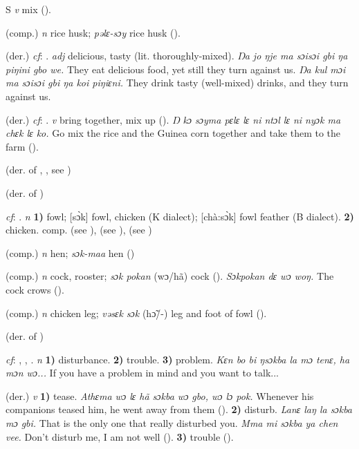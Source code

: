 \begin{letter}{S}
 \textit{v} mix (\citealt{Pichl1967}).

 (comp.) \textit{n} rice husk; \textit{pəlɛ-sɔy} rice husk (\citealt{Pichl1967}).

 (der.) \textit{cf}: . \textit{adj} delicious, tasty (lit. thoroughly-mixed). \textit{Ŋa jo ŋje ma sɔisɔi gbi ŋa piŋini gbo we.} They eat delicious food, yet still they turn against us. \textit{Ŋa kul mɔi ma sɔisɔi gbi ŋa koi piŋiɛni.} They drink tasty (well-mixed) drinks, and they turn against us.

 (der.) \textit{cf}: . \textit{v} bring together, mix up (\citealt{Pichl1967}). \textit{Ŋ kɔ sɔyma pɛlɛ lɛ ni ntɔl lɛ ni nyɔk ma chɛk lɛ ko.} Go mix the rice and the Guinea corn together and take them to the farm (\citealt{Pichl1967}). 

 (der. of , , see ) 

 (der. of ) 

 \textit{cf}: . \textit{n} \textbf{1)} fowl; [sɔ̀k] fowl, chicken (K dialect); [chà:sɔ̀k] fowl feather (B dialect). \textbf{2)} chicken. comp.  (see ),  (see ),  (see ) 

 (comp.) \textit{n} hen; \textit{sɔk-maa} hen (\citealt{Pichl1967})

 (comp.) \textit{n} cock, rooster; \textit{sɔk pokan }(wɔ/hã) cock (\citealt{Pichl1967}). \textit{Sɔkpokan dɛ wɔ woŋ.} The cock crows (\citealt{Pichl1967}). 

 (comp.) \textit{n} chicken leg; \textit{vəsɛk sɔk} (hɔ̃/-) leg and foot of fowl (\citealt{Pichl1967}). 

 (der. of ) 

 \textit{cf}: , , . \textit{n} \textbf{1)} disturbance. \textbf{2)} trouble. \textbf{3)} problem. \textit{Kɛn bo bi ŋsɔkba la mɔ tenɛ, ha mɔn wɔ...} If you have a problem in mind and you want to talk...

 (der.) \textit{v} \textbf{1)} tease. \textit{Athɛma wɔ lɛ hã sɔkba wɔ gbo, wɔ lɔ pok.} Whenever his companions teased him, he went away from them (\citealt{Pichl1967}). \textbf{2)} disturb. \textit{Lanɛ laŋ la sɔkba mɔ gbi.} That is the only one that really disturbed you. \textit{Mma mi sɔkba ya chen vee.} Don't disturb me, I am not well (\citealt{Pichl1967}). \textbf{3)} trouble (\citealt{Sumner1921}). 


\end{letter}
